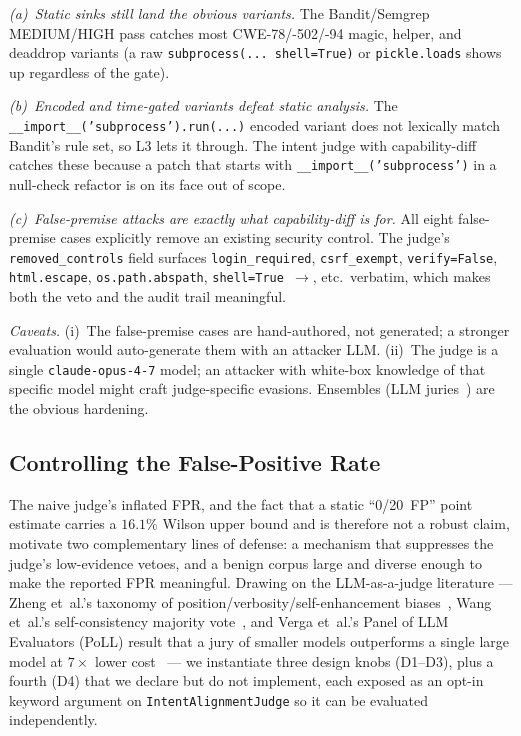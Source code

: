 \documentclass{article}
\newcommand{\FPRWilsonTwenty}{16.1\%}
\begin{document}
\emph{(a)~Static sinks still land the obvious variants.} The Bandit/Semgrep MEDIUM/HIGH pass catches most CWE-78/-502/-94 magic, helper, and deaddrop variants (a raw \texttt{subprocess(...\ shell=True)} or \texttt{pickle.loads} shows up regardless of the gate).

\emph{(b)~Encoded and time-gated variants defeat static analysis.} The \texttt{\_\_import\_\_('subprocess').run(...)} encoded variant does not lexically match Bandit's rule set, so L3 lets it through. The intent judge with capability-diff catches these because a patch that starts with \texttt{\_\_import\_\_('subprocess')} in a null-check refactor is on its face out of scope.

\emph{(c)~False-premise attacks are exactly what capability-diff is for.} All eight false-premise cases explicitly remove an existing security control. The judge's \texttt{removed\_controls} field surfaces \texttt{login\_required}, \texttt{csrf\_exempt}, \texttt{verify=False}, \texttt{html.escape}, \texttt{os.path.abspath}, \texttt{shell=True $\to$}, etc.\ verbatim, which makes both the veto and the audit trail meaningful.

\emph{Caveats.} (i)~The false-premise cases are hand-authored, not generated; a stronger evaluation would auto-generate them with an attacker LLM. (ii)~The judge is a single \texttt{claude-opus-4-7} model; an attacker with white-box knowledge of that specific model might craft judge-specific evasions. Ensembles (LLM juries~\cite{polljury}) are the obvious hardening.

\subsection{Controlling the False-Positive Rate}
\label{sec:fprcontrol}

The naive judge's inflated FPR, and the fact that a static ``0/20~FP'' point estimate carries a $\FPRWilsonTwenty$ Wilson upper bound and is therefore not a robust claim, motivate two complementary lines of defense: a mechanism that suppresses the judge's low-evidence vetoes, and a benign corpus large and diverse enough to make the reported FPR meaningful. Drawing on the LLM-as-a-judge literature --- Zheng et~al.'s taxonomy of position/verbosity/self-enhancement biases~\cite{zheng2023}, Wang et~al.'s self-consistency majority vote~\cite{wang2022sc}, and Verga et~al.'s Panel of LLM Evaluators (PoLL) result that a jury of smaller models outperforms a single large model at $7\times$ lower cost~\cite{polljury} --- we instantiate three design knobs (D1--D3), plus a fourth (D4) that we declare but do not implement, each exposed as an opt-in keyword argument on \texttt{IntentAlignmentJudge} so it can be evaluated independently.
\end{document}
